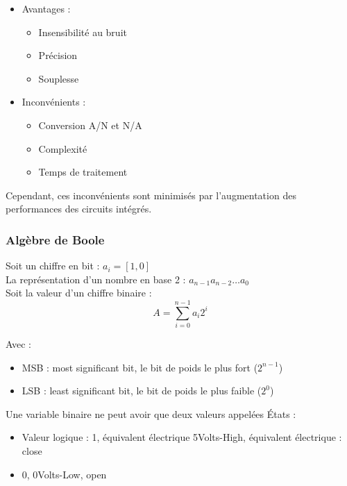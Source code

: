\documentclass[../main.tex]{subfiles}
\begin{document}
\begin{itemize}
    \item Avantages : \begin{itemize}
        \item Insensibilité au bruit\\
        \item Précision\\
        \item Souplesse\\
    \end{itemize}
    \item Inconvénients : \begin{itemize}
        \item Conversion A/N et N/A\\
        \item Complexité\\
        \item Temps de traitement\\
    \end{itemize}
\end{itemize}

Cependant, ces inconvénients sont minimisés par l'augmentation des performances des circuits intégrés.\\

\subsubsection{Algèbre de Boole}

Soit un chiffre en bit : $a_i = [1,0]$\\
La représentation d'un nombre en base 2 : $a_{n-1} a_{n-2}\dots a_0$\\
Soit la valeur d'un chiffre binaire : \begin{equation}
    A = \sum_{i=0}^{n-1} a_i 2^i
\end{equation}

Avec : \begin{itemize}
    \item MSB : most significant bit, le bit de poids le plus fort ($2^{n-1}$)\\
    \item LSB : least significant bit, le bit de poids le plus faible ($2^0$)\\
\end{itemize}

Une variable binaire ne peut avoir que deux valeurs appelées États : \begin{itemize}
    \item Valeur logique : 1, équivalent électrique 5Volts-High, équivalent électrique : close\\
    \item 0, 0Volts-Low, open\\
\end{itemize}
\end{document}
